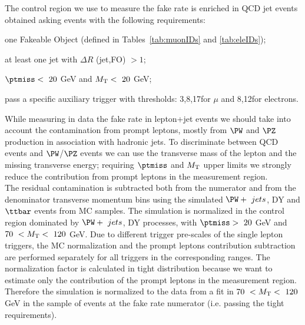 The control region we use to measure the fake rate is enriched in QCD jet events obtained asking events with the following requirements:
\begin{itemize}
\setlength\itemsep{-0.2em}
  {\footnotesize
	\item one Fakeable Object (defined in Tables~\ref{tab:muonIDs} and \ref{tab:eleIDs});
	\item at least one jet with $\Delta R$ (jet,FO) $>1$;
	\item $\ptmiss < \ 20$ GeV and $M_{\mathrm{T}} < \ 20 $ GeV;
	\item pass a specific auxiliary trigger with \pt thresholds:
          3,8,17\GeV for $\mu$ and 8,12\GeV for electrons.}
\end{itemize}

While measuring in data the fake rate in lepton+jet events we should take into account the contamination from prompt leptons, mostly from $\PW$ and $\PZ$ production in association with hadronic jets.
 To discriminate between QCD events and $\PW$/$\PZ$ events we can use the transverse mass of the lepton and the missing transverse energy; requiring $\ptmiss$ and $M_{\mathrm{T}}$ upper limits we strongly reduce
  the contribution from prompt leptons in the measurement region. \\
The residual contamination is subtracted both from the numerator and from the denominator transverse momentum bins using the simulated $\PW + \ jets$, DY and $\ttbar$ events from MC samples. The simulation is normalized in the control region dominated by $\PW + \ jets$, DY processes, with $\ptmiss > \ 20$ GeV and $70 \ < \MT < \ 120 $ GeV.
Due to different trigger pre-scales of the single lepton triggers, the
MC normalization and the prompt leptons contribution subtraction are
performed separately for all triggers in the corresponding \pt ranges.
The normalization factor is calculated in tight distribution because we want to estimate only the contribution of the prompt leptons in the measurement region. Therefore the simulation is normalized to the data from a fit in $70 \ < \MT < \ 120 $ GeV in the
sample of events at the fake rate numerator (i.e. passing the tight requirements).

